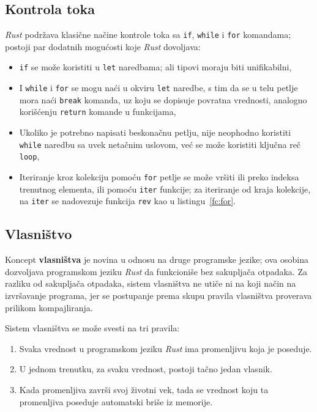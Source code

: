 \documentclass[12pt,oneside]{memoir}
\begin{document}
\subsection{Kontrola toka}
\emph{Rust} podržava klasične načine kontrole toka sa \texttt{if},
\texttt{while} i \texttt{for} komandama; postoji par dodatnih mogućosti
koje \emph{Rust} dovoljava:

\begin{itemize}
  \item \texttt{if} se može koristiti u \texttt{let} naredbama; ali
        tipovi moraju biti unifikabilni,
  \item I \texttt{while} i \texttt{for} se mogu naći u okviru \texttt{let}
        naredbe, s tim da se u telu petlje mora naći \texttt{break} komanda,
        uz koju se dopisuje povratna vrednosti, analogno korišćenju \texttt{return}
        komande u funkcijama,
  \item Ukoliko je potrebno napisati beskonačnu petlju, nije neophodno koristiti
        \texttt{while} naredbu sa uvek netačnim uslovom, već se može koristiti
        ključna reč \texttt{loop},
  \item Iteriranje kroz kolekciju pomoću \texttt{for} petlje se može vršiti ili
        preko indeksa trenutnog elementa, ili pomoću \texttt{iter} funkcije;
        za iteriranje od kraja kolekcije, na \texttt{iter} se nadovezuje
        funkcija \texttt{rev} kao u listingu~\ref{fc:for}.
\end{itemize}



\subsection{Vlasništvo}
Koncept \textbf{vlasništva} je novina u odnosu na druge programske jezike; ova
osobina dozvoljava programskom jeziku \emph{Rust} da funkcioniše bez sakupljača
otpadaka. Za razliku od sakupljača otpadaka, sistem vlasništva ne utiče ni na
koji način na izvršavanje programa, jer se postupanje prema skupu pravila
vlasništva proverava prilikom kompajliranja.

Sistem vlasništva se može svesti na tri pravila:

\begin{enumerate}
  \item Svaka vrednost u programskom jeziku \emph{Rust} ima promenljivu koja
        je poseduje.
  \item U jednom trenutku, za svaku vrednost, postoji tačno jedan vlasnik.
  \item Kada promenljiva završi svoj životni vek, tada se vrednost
        koju ta promenljiva poseduje automatski briše iz memorije.
\end{enumerate}
\end{document}
